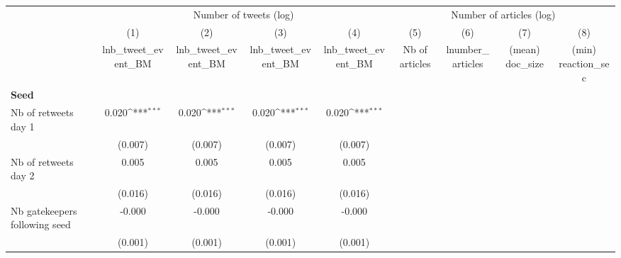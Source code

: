 {
\def\sym#1{\ifmmode^{#1}\else\(^{#1}\)\fi}
\begin{tabular}{l*{8}{c}}
\hline\hline
                    &\multicolumn{4}{c}{Number of tweets (log)}                                             &\multicolumn{4}{c}{Number of articles (log)}                                           \\\cmidrule(lr){2-5}\cmidrule(lr){6-9}
                    &\multicolumn{1}{c}{(1)}&\multicolumn{1}{c}{(2)}&\multicolumn{1}{c}{(3)}&\multicolumn{1}{c}{(4)}&\multicolumn{1}{c}{(5)}&\multicolumn{1}{c}{(6)}&\multicolumn{1}{c}{(7)}&\multicolumn{1}{c}{(8)}\\
                    &\multicolumn{1}{c}{lnb\_tweet\_event\_BM}&\multicolumn{1}{c}{lnb\_tweet\_event\_BM}&\multicolumn{1}{c}{lnb\_tweet\_event\_BM}&\multicolumn{1}{c}{lnb\_tweet\_event\_BM}&\multicolumn{1}{c}{Nb of articles}&\multicolumn{1}{c}{lnumber\_articles}&\multicolumn{1}{c}{(mean) doc\_size}&\multicolumn{1}{c}{(min) reaction\_sec}\\
\hline
\textbf{Seed}       &                     &                     &                     &                     &                     &                     &                     &                     \\
Nb of retweets day 1&       0.020\sym{***}&       0.020\sym{***}&       0.020\sym{***}&       0.020\sym{***}&                     &                     &                     &                     \\
                    &     (0.007)         &     (0.007)         &     (0.007)         &     (0.007)         &                     &                     &                     &                     \\
Nb of retweets day 2&       0.005         &       0.005         &       0.005         &       0.005         &                     &                     &                     &                     \\
                    &     (0.016)         &     (0.016)         &     (0.016)         &     (0.016)         &                     &                     &                     &                     \\
Nb gatekeepers following seed&      -0.000         &      -0.000         &      -0.000         &      -0.000         &                     &                     &                     &                     \\
                    &     (0.001)         &     (0.001)         &     (0.001)         &     (0.001)         &                     &                     &                     &                     \\

\end{tabular}}
